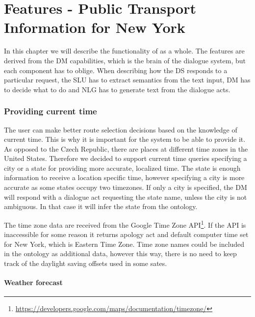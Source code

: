 \chapter{Features - Public Transport Information for New York}

In this chapter we will describe the functionality of  as a whole.
The features are derived from the DM capabilities, which is the brain of the dialogue system, but each component has to oblige.
When describing how the DS responds to a particular request, the SLU has to extract semantics from the text input, DM has to decide what to do and NLG has to generate text from the dialogue acts.

\subsection{Providing current time} \label{subsec:time}

The user can make better route selection decisions based on the knowledge of current time.
This is why it is important for the system to be able to provide it.
As opposed to the Czech Republic, there are places at different time zones in the United States.
Therefore we decided to support current time queries specifying a city or a state for providing more accurate, localized time.
The state is enough information to receive a location specific time, however specifying a city is more accurate as some states occupy two timezones.
If only a city is specified, the DM will respond with a dialogue act requesting the state name, unless the city is not ambiguous.
In that case it will infer the state from the ontology.

The time zone data are received from the Google Time Zone API\footnote{\url{https://developers.google.com/maps/documentation/timezone/}}.
If the API is inaccessible for some reason it returns apology act and default computer time set for New York, which is Eastern Time Zone.
Time zone names could be included in the ontology as additional data, however this way, there is no need to keep track of the daylight saving offsets used in some sates.

\subsubsection{Weather forecast}

